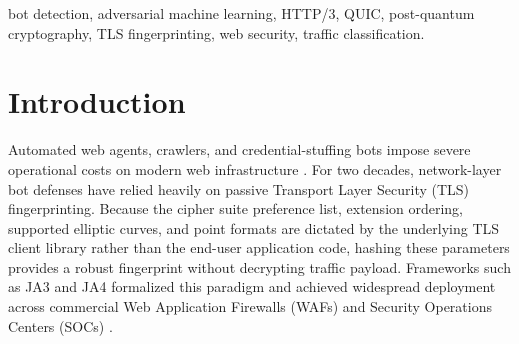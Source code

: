 \documentclass[conference]{IEEEtran}
\begin{document}
\begin{abstract}
Our findings establish four key results. First, against non-adaptive bots, post-quantum and QUIC protocol features provide zero measurable in-distribution gain over classical TLS features combined with behavioural pacing (both reaching an identical 0.9958 accuracy and 1.3\% human false-positive rate). Second, this in-distribution success is brittle: under a held-out adaptive adversary, all conventional models suffer catastrophic evasion of 95.9\% to 97.3\%. Third, cross-session temporal consistency restores detection, slashing evasion from 58.1\% to 18.9\% under default XGBoost ($p = 2 \times 10^{-6}$, McNemar test), and further to \textbf{14.9\%} with tuned hyperparameters and minority class weighting (stable across five random seeds at $16.5\% \pm 4.8\%$). On threshold-independent metrics, temporal consistency elevates human-vs.-adaptive-bot ROC-AUC from 0.795 to \textbf{0.943} and PR-AUC from 0.610 to \textbf{0.905}. Fourth, spatial consistency yields a mean absolute SHAP attribution of exactly zero due to feature collinearity and distribution collapse. We formalize a parametric closed-form risk formula ($C(s)$) and a group-level Noisy-OR aggregation rule that detects 81.0\% of adaptive groups. We conclude that cross-session temporal stability, rather than ephemeral per-handshake protocol detail, represents the sustainable signal against adversaries who understand modern fingerprinting schemas.
\end{abstract}

\begin{IEEEkeywords}
bot detection, adversarial machine learning, HTTP/3, QUIC, post-quantum cryptography, TLS fingerprinting, web security, traffic classification.
\end{IEEEkeywords}

\section{Introduction}
Automated web agents, crawlers, and credential-stuffing bots impose severe operational costs on modern web infrastructure \cite{hou2020botmeter}. For two decades, network-layer bot defenses have relied heavily on passive Transport Layer Security (TLS) fingerprinting. Because the cipher suite preference list, extension ordering, supported elliptic curves, and point formats are dictated by the underlying TLS client library rather than the end-user application code, hashing these parameters provides a robust fingerprint without decrypting traffic payload. Frameworks such as JA3 \cite{althouse2017ja3} and JA4 \cite{foxio2024ja4} formalized this paradigm and achieved widespread deployment across commercial Web Application Firewalls (WAFs) and Security Operations Centers (SOCs) \cite{anderson2016identifying}.
\end{document}
